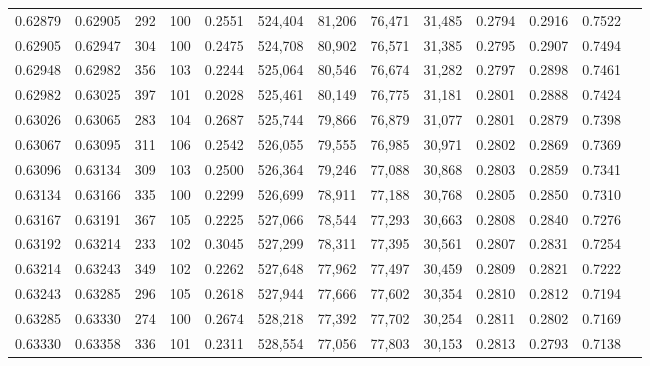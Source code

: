 \begin{tabular}{rrrrrrrrrrrrr}
0.62879 & 0.62905 &   292 & 100 &                                     0.2551 & 524,404 &  81,206 &  76,471 &  31,485 & 0.2794 & 0.2916 & 0.7522 \\
0.62905 & 0.62947 &   304 & 100 &                                     0.2475 & 524,708 &  80,902 &  76,571 &  31,385 & 0.2795 & 0.2907 & 0.7494 \\
0.62948 & 0.62982 &   356 & 103 &                                     0.2244 & 525,064 &  80,546 &  76,674 &  31,282 & 0.2797 & 0.2898 & 0.7461 \\
0.62982 & 0.63025 &   397 & 101 &                                     0.2028 & 525,461 &  80,149 &  76,775 &  31,181 & 0.2801 & 0.2888 & 0.7424 \\
0.63026 & 0.63065 &   283 & 104 &                                     0.2687 & 525,744 &  79,866 &  76,879 &  31,077 & 0.2801 & 0.2879 & 0.7398 \\
0.63067 & 0.63095 &   311 & 106 &                                     0.2542 & 526,055 &  79,555 &  76,985 &  30,971 & 0.2802 & 0.2869 & 0.7369 \\
0.63096 & 0.63134 &   309 & 103 &                                     0.2500 & 526,364 &  79,246 &  77,088 &  30,868 & 0.2803 & 0.2859 & 0.7341 \\
0.63134 & 0.63166 &   335 & 100 &                                     0.2299 & 526,699 &  78,911 &  77,188 &  30,768 & 0.2805 & 0.2850 & 0.7310 \\
0.63167 & 0.63191 &   367 & 105 &                                     0.2225 & 527,066 &  78,544 &  77,293 &  30,663 & 0.2808 & 0.2840 & 0.7276 \\
0.63192 & 0.63214 &   233 & 102 &                                     0.3045 & 527,299 &  78,311 &  77,395 &  30,561 & 0.2807 & 0.2831 & 0.7254 \\
0.63214 & 0.63243 &   349 & 102 &                                     0.2262 & 527,648 &  77,962 &  77,497 &  30,459 & 0.2809 & 0.2821 & 0.7222 \\
0.63243 & 0.63285 &   296 & 105 &                                     0.2618 & 527,944 &  77,666 &  77,602 &  30,354 & 0.2810 & 0.2812 & 0.7194 \\
0.63285 & 0.63330 &   274 & 100 &                                     0.2674 & 528,218 &  77,392 &  77,702 &  30,254 & 0.2811 & 0.2802 & 0.7169 \\
0.63330 & 0.63358 &   336 & 101 &                                     0.2311 & 528,554 &  77,056 &  77,803 &  30,153 & 0.2813 & 0.2793 & 0.7138 \\

\end{tabular}
